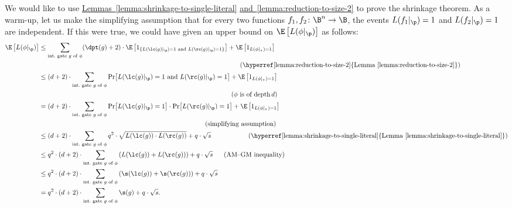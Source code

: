 \documentclass[11pt]{article}
\numberwithin{equation}{section}
\theoremstyle{definition}
\theoremstyle{plain}
\newcommand{\expref}[2]{\hyperref[#2]{#1~\ref{#2}}}
\theoremstyle{definition}\newtheorem{notation}[theorem]{Notation}\theoremstyle{plain}
\begin{document}
We would like to use \expref{Lemmas}{lemma:shrinkage-to-single-literal}
\expref{and}{lemma:reduction-to-size-2}
to prove the shrinkage theorem. As a warm-up, let us make the simplifying
assumption that for every two functions $f_{1},f_{2}\colon\B^{n}\to\B$,
the events $L(f_{1}|_{\p})=1$ and $L(f_{2}|_{\p})=1$ are independent.
If this were true, we could have
%
given an upper bound on %
$\E\left[L(\phi|_{\p})\right]$
as follows: 
%
%
%
%
%
%
%
%
%
%
%
%
\begin{align*}
\E\left[L(\phi|_{\p})\right] & \le\sum_{\text{int.\ gate \ensuremath{g} of \ensuremath{\phi}}}(\dpt(g)+2)\cdot\E\left[1_{\left\{ L(\lc(g)|_{\p})=1\text{ and }L(\rc(g)|_{\p})=1\right\} }\right] 
 +\E\left[1_{L(\phi|_{\pi})=1}\right]\\
 & \qquad\qquad\qquad\qquad\qquad\qquad\qquad\qquad\qquad
   \qquad\qquad\qquad\qquad\qquad\qquad\ \
\text{(\expref{Lemma}{lemma:reduction-to-size-2})}\\        %
 & \le(d+2)\cdot\sum_{\text{int.\ gate \ensuremath{g} of \ensuremath{\phi}}}\Pr\!\left[L(\lc(g)|_{\p})=1\text{ and }L(\rc(g)|_{\p})=1\right] 
 +\E\left[1_{L(\phi|_{\pi})=1}\right]\\
 & \qquad\qquad\qquad\qquad\qquad\qquad\qquad\qquad\qquad
   \qquad\qquad\qquad\qquad\qquad\quad\ 
\text{(\ensuremath{\phi} is of depth\,\ensuremath{d})}\\ %
 & =(d+2)\cdot\sum_{\text{int.\ gate \ensuremath{g} of \ensuremath{\phi}}}\Pr\!\left[L(\lc(g)|_{\p})=1\right]\cdot\Pr\!\left[L(\rc(g)|_{\p})=1\right] 
  +\E\left[1_{L(\phi|_{\pi})=1}\right]\\
& \qquad\qquad\qquad\qquad\qquad\qquad\qquad\qquad\qquad
  \qquad\qquad\qquad\quad\ 
\text{(simplifying assumption)}\\          %
  & \le(d+2)\cdot\sum_{\text{int.\ gate \ensuremath{g} of \ensuremath{\phi}}}q^{2}\cdot\sqrt{L(\lc(g))\cdot L(\rc(g))}+q\cdot\sqrt{s}
\qquad\qquad\quad\ \
  \text{(\expref{Lemma}{lemma:shrinkage-to-single-literal})}\\  %
& \le q^{2}\cdot(d+2)\cdot\sum_{\text{int.\ gate \ensuremath{g} of \ensuremath{\phi}}}\left(L(\lc(g))+L(\rc(g))\right)+q\cdot\sqrt{s}
  \quad\ \    \text{(AM--GM inequality)}\\              %
%
 & \le q^{2}\cdot(d+2)\cdot\sum_{\text{int.\ gate \ensuremath{g} of \ensuremath{\phi}}}\left(\s(\lc(g))+\s(\rc(g))\right)+q\cdot\sqrt{s}\\
 & =q^{2}\cdot(d+2)\cdot\sum_{\text{int.\ gate \ensuremath{g} of \ensuremath{\phi}}}\s(g)+q\cdot\sqrt{s}.
\end{align*}  
\end{document}
